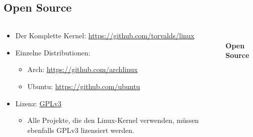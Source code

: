\documentclass[
    ngerman,
    accentcolor=3b,
    fontsize= 12pt,
    a4paper,
    aspectratio=169,
    colorback=true,
    fancy_row_colors,
    leqno,
    fleqn,
    boxarc=3pt,
    fleqn,
    main,
    design=2008,
]{algoslides}
\begin{document}
    \subsection{Open Source}
    \begin{frame}[c]
        \slidehead{}
        \begin{columns}
            \begin{column}[c]{0.5\textwidth}
                \begin{itemize}
                    \item Der Komplette Kernel: \url{https://github.com/torvalds/linux}
                    \item Einzelne Distributionen:
                        \begin{itemize}
                            \item Arch: \url{https://github.com/archlinux}
                            \item Ubuntu: \url{https://github.com/ubuntu}
                        \end{itemize}
                    \item Lizenz: \href{https://www.gnu.org/licenses/gpl-3.0.html}{GPLv3}
                        \begin{itemize}
                            \item Alle Projekte, die den Linux-Kernel verwenden, müssen ebenfalls GPLv3 lizensiert werden.
                        \end{itemize}
                \end{itemize}
            \end{column}
            \begin{column}[c]{0.5\textwidth}
                \begin{center}
                    \fontsize{50pt}{0pt}\selectfont\faOsi{}\\[0.2cm]
                    \normalsize\textbf{Open Source}
                \end{center}
            \end{column}
        \end{columns}
    \end{frame}
\end{document}
